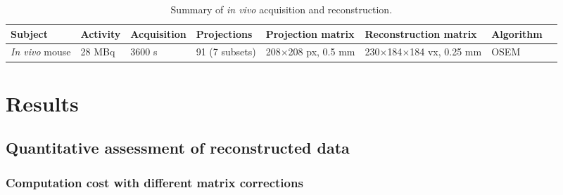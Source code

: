 \documentclass[utf8]{FrontiersinHarvard} %
\begin{document}
\begin{table}[h!]
\caption{Summary of \textit{in vivo} acquisition and reconstruction.\label{tab:invivo_summary}}
\footnotesize
\begin{tabular}{l l l l l l l l}
	\hline
	Subject & Activity & Acquisition & Projections & Projection matrix & Reconstruction matrix & Algorithm\\ \hline
	
	\textit{In vivo} mouse & 28 MBq & 3600 s & 91 (7 subsets) & 208$\times$208 px, 0.5 mm & 230$\times$184$\times$184 vx, 0.25 mm & OSEM	\\ \hline
\end{tabular}
\end{table}

\section{Results}



\subsection{Quantitative assessment of reconstructed data}

\subsubsection{Computation cost with different matrix corrections}
\end{document}
